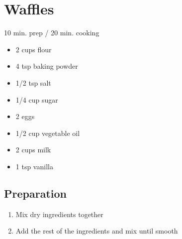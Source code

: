 \documentclass{article}
\begin{document}
\section{Waffles}

10 min. prep / 20 min. cooking

\begin{itemize}
\item 2 cups flour
\item 4 tsp baking powder
\item 1/2 tsp salt
\item 1/4 cup sugar
\item 2 eggs
\item 1/2 cup vegetable oil
\item 2 cups milk
\item 1 tsp vanilla
\end{itemize}

\subsection{Preparation}

\begin{enumerate}
\item Mix dry ingredients together
\item Add the rest of the ingredients and mix until smooth
\end{enumerate}
\end{document}
